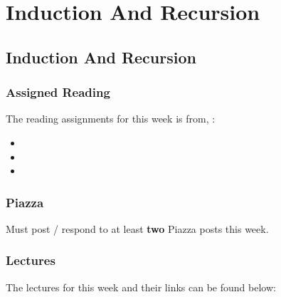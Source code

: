 \clearpage

\renewcommand{\ChapTitle}{Induction And Recursion}
\renewcommand{\SectionTitle}{Induction And Recursion}

\chapter{\ChapTitle}
\section{\SectionTitle}

\subsection{Assigned Reading}

The reading assignments for this week is from, \Textbook:

\begin{itemize}
    \item {}
    \item {}
    \item {}
\end{itemize}

\subsection{Piazza}

Must post / respond to at least \textbf{two} Piazza posts this week.

\subsection{Lectures}

The lectures for this week and their links can be found below:

